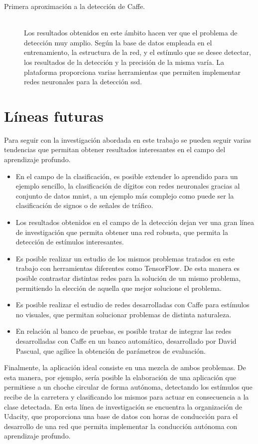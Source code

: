 \begin{description}
	\item[Primera aproximación a la detección de Caffe.] \hfill 
	\vspace{5pt}
	\\
	Los resultados obtenidos en este ámbito hacen ver que el problema de detección muy amplio. Según la base de datos empleada en el entrenamiento, la estructura de la red, y el estímulo que se desee detectar, los resultados de la detección y la precisión de la misma varía. La plataforma proporciona varias herramientas que permiten implementar redes neuronales para la detección \acrshort{ssd}.
\end{description}

\section{Líneas futuras}
Para seguir con la investigación abordada en este trabajo se pueden seguir varias tendencias que permitan obtener resultados interesantes en el campo del aprendizaje profundo.
\begin{itemize}
	\item En el campo de la clasificación, es posible extender lo aprendido para un ejemplo sencillo, la clasificación de dígitos con redes neuronales gracias al conjunto de datos \acrshort{mnist}, a un ejemplo más complejo como puede ser la clasificación de signos o de señales de tráfico.
	\item Los resultados obtenidos en el campo de la detección dejan ver una gran línea de investigación que permita obtener una red robusta, que permita la detección de estímulos interesantes.
	\item Es posible realizar un estudio de los mismos problemas tratados en este trabajo con herramientas diferentes como TensorFlow. De esta manera es posible contrastar distintas redes para la solución de un mismo problema, permitiendo la elección de aquella que mejor solucione el problema.
	\item Es posible realizar el estudio de redes desarrolladas con Caffe para estímulos no visuales, que permitan solucionar problemas de distinta naturaleza.
	\item En relación al banco de pruebas, es posible tratar de integrar las redes desarrolladas con Caffe en un banco automático, desarrollado por David Pascual, que agilice la obtención de parámetros de evaluación.
\end{itemize}

Finalmente, la aplicación ideal consiste en una mezcla de ambos problemas. De esta manera, por ejemplo, sería posible la elaboración de una aplicación que permitiese a un choche circular de forma autónoma, detectando los estímulos que recibe de la carretera y clasificando los mismos para actuar en consecuencia a la clase detectada. En esta línea de investigación se encuentra la organización de Udacity, que proporciona una base de datos con horas de conducción para el desarrollo de una red que permita implementar la conducción autónoma con aprendizaje profundo.\\

